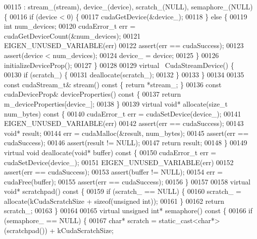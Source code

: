 \begin{DoxyCode}
00115       : stream\_(stream), device\_(device), scratch\_(NULL), semaphore\_(NULL) \{
00116     \textcolor{keywordflow}{if} (device < 0) \{
00117       cudaGetDevice(&device\_);
00118     \} \textcolor{keywordflow}{else} \{
00119       \textcolor{keywordtype}{int} num\_devices;
00120       cudaError\_t err = cudaGetDeviceCount(&num\_devices);
00121       EIGEN\_UNUSED\_VARIABLE(err)
00122       assert(err == cudaSuccess);
00123       assert(device < num\_devices);
00124       device\_ = device;
00125     \}
00126     initializeDeviceProp();
00127   \}
00128 
00129   \textcolor{keyword}{virtual} ~CudaStreamDevice() \{
00130     \textcolor{keywordflow}{if} (scratch\_) \{
00131       deallocate(scratch\_);
00132     \}
00133   \}
00134 
00135   \textcolor{keyword}{const} cudaStream\_t& stream()\textcolor{keyword}{ const }\{ \textcolor{keywordflow}{return} *stream\_; \}
00136   \textcolor{keyword}{const} cudaDeviceProp& deviceProperties()\textcolor{keyword}{ const }\{
00137     \textcolor{keywordflow}{return} m\_deviceProperties[device\_];
00138   \}
00139   \textcolor{keyword}{virtual} \textcolor{keywordtype}{void}* allocate(\textcolor{keywordtype}{size\_t} num\_bytes)\textcolor{keyword}{ const }\{
00140     cudaError\_t err = cudaSetDevice(device\_);
00141     EIGEN\_UNUSED\_VARIABLE(err)
00142     assert(err == cudaSuccess);
00143     \textcolor{keywordtype}{void}* result;
00144     err = cudaMalloc(&result, num\_bytes);
00145     assert(err == cudaSuccess);
00146     assert(result != NULL);
00147     \textcolor{keywordflow}{return} result;
00148   \}
00149   \textcolor{keyword}{virtual} \textcolor{keywordtype}{void} deallocate(\textcolor{keywordtype}{void}* buffer)\textcolor{keyword}{ const }\{
00150     cudaError\_t err = cudaSetDevice(device\_);
00151     EIGEN\_UNUSED\_VARIABLE(err)
00152     assert(err == cudaSuccess);
00153     assert(buffer != NULL);
00154     err = cudaFree(buffer);
00155     assert(err == cudaSuccess);
00156   \}
00157 
00158   \textcolor{keyword}{virtual} \textcolor{keywordtype}{void}* scratchpad()\textcolor{keyword}{ const }\{
00159     \textcolor{keywordflow}{if} (scratch\_ == NULL) \{
00160       scratch\_ = allocate(kCudaScratchSize + \textcolor{keyword}{sizeof}(\textcolor{keywordtype}{unsigned} \textcolor{keywordtype}{int}));
00161     \}
00162     \textcolor{keywordflow}{return} scratch\_;
00163   \}
00164 
00165   \textcolor{keyword}{virtual} \textcolor{keywordtype}{unsigned} \textcolor{keywordtype}{int}* semaphore()\textcolor{keyword}{ const }\{
00166     \textcolor{keywordflow}{if} (semaphore\_ == NULL) \{
00167       \textcolor{keywordtype}{char}* scratch = \textcolor{keyword}{static\_cast<}\textcolor{keywordtype}{char}*\textcolor{keyword}{>}(scratchpad()) + kCudaScratchSize;

\end{DoxyCode}
